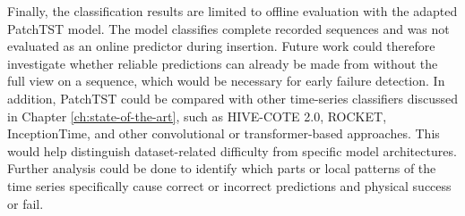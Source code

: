 Finally, the classification results are limited to offline evaluation with the adapted PatchTST model. The model classifies complete recorded sequences and was not evaluated as an online predictor during insertion. Future work could therefore investigate whether reliable predictions can already be made from without the full view on a sequence, which would be necessary for early failure detection. In addition, PatchTST could be compared with other time-series classifiers discussed in Chapter \ref{ch:state-of-the-art}, such as HIVE-COTE 2.0, ROCKET, InceptionTime, and other convolutional or transformer-based approaches. This would help distinguish dataset-related difficulty from specific model architectures. Further analysis could be done to identify which parts or local patterns of the time series specifically cause correct or incorrect predictions and physical success or fail.


